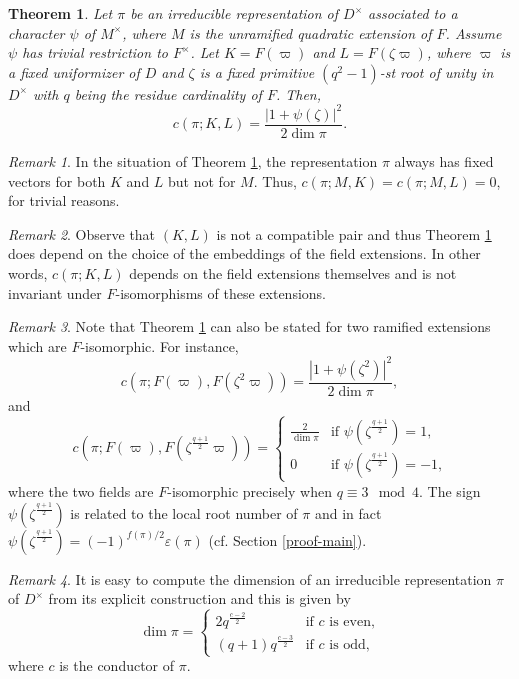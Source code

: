 \documentclass[12pt]{amsart}
\newtheorem{theorem}{Theorem}[section] %
\theoremstyle{definition}
\theoremstyle{remark}
\newtheorem{remark}{Remark}
\begin{document}
\begin{theorem}\label{thm-even}
Let $\pi$ be an irreducible representation of $D^\times$ associated to a character $\psi$ of $M^\times$, where $M$ is the unramified quadratic extension of $F$. Assume $\psi$ has trivial restriction to $F^\times$. Let $K=F(\varpi)$ and $L=F(\zeta\varpi)$, where $\varpi$ is a fixed uniformizer of $D$ and $\zeta$ is a fixed primitive $(q^2-1)$-st root of unity in $D^\times$ with $q$ being the residue cardinality of $F$. Then,
\[c(\pi; K, L) = \frac{|1 + \psi(\zeta)|^2}{2 \dim \pi}.\]
\end{theorem}
\begin{remark}\label{trivial1}
In the situation of Theorem \ref{thm-even}, the representation $\pi$ always has fixed vectors for both $K$ and $L$ but not for $M$. Thus, $c(\pi;M,K) = c(\pi;M,L) = 0$, for trivial reasons.
\end{remark}
\begin{remark}\label{rmk-iso}
Observe that $(K,L)$ is not a compatible pair and thus Theorem \ref{thm-even} does depend on the choice of the embeddings of the field extensions. In other words, $c(\pi;K,L)$ depends on the field extensions themselves and is not invariant under $F$-isomorphisms of these extensions. 
\end{remark}
\begin{remark}\label{rmk-iso-1}
Note that Theorem \ref{thm-even} can also be stated for two ramified extensions which are $F$-isomorphic. For instance,
\[c(\pi;F(\varpi),F(\zeta^2\varpi)) =  \frac{|1 + \psi(\zeta^2)|^2}{2 \dim \pi},\]
and
\[c(\pi;F(\varpi),F(\zeta^{\frac{q+1}{2}}\varpi)) = 
\begin{cases}
\frac{2}{\dim \pi} &\text{if $\psi(\zeta^{\frac{q+1}{2}}) = 1$,} \\
0 &\text{if $\psi(\zeta^{\frac{q+1}{2}}) = -1$,} 
\end{cases}
\]
where the two fields are $F$-isomorphic precisely when $q \equiv 3 \mod 4$. The sign $\psi(\zeta^{\frac{q+1}{2}})$ is related to the local root number of $\pi$ and in fact $\psi(\zeta^{\frac{q+1}{2}}) = (-1)^{f(\pi)/2}\varepsilon(\pi)$ (cf. Section \ref{proof-main}).
\end{remark}
\begin{remark}
It is easy to compute the dimension of an irreducible representation $\pi$ of $D^\times$ from its explicit construction and this is given by 
\[\dim \pi = \begin{cases}
2q^{\frac{c-2}{2}} &\text{if $c$ is even,} \\
(q+1)q^{\frac{c-3}{2}} &\text{if $c$ is odd,}
\end{cases}\]
where $c$ is the conductor of $\pi$. 
\end{remark}
\end{document}
